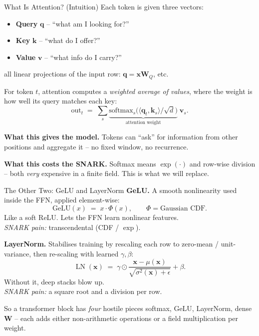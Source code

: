 \documentclass[10pt]{beamer}
\newcommand{\bx}{\mathbf{x}}
\newcommand{\bW}{\mathbf{W}}
\newcommand{\bk}{\mathbf{k}}
\newcommand{\bv}{\mathbf{v}}
\newcommand{\bq}{\mathbf{q}}
\newcommand{\softmax}{\mathrm{softmax}}
\DeclareMathOperator{\LN}{LN}
\begin{document}
\begin{frame}{What Is Attention? (Intuition)}
Each token is given three vectors:
\begin{itemize}
  \item \textbf{Query} $\bq$ -- ``what am I looking for?''
  \item \textbf{Key} $\bk$ -- ``what do I offer?''
  \item \textbf{Value} $\bv$ -- ``what info do I carry?''
\end{itemize}
all linear projections of the input row: $\bq=\bx\bW_Q$, etc.

\medskip
For token $t$, attention computes a \emph{weighted average of values},
where the weight is how well its query matches each key:
\[
  \mathrm{out}_t \;=\; \sum_{s} \underbrace{\softmax_s\!\bigl(\langle\bq_t,\bk_s\rangle/\sqrt d\bigr)}_{\text{attention weight}}\;\bv_s.
\]

\medskip
\textbf{What this gives the model.} Tokens can ``ask'' for
information from other positions and aggregate it -- no fixed
window, no recurrence.

\medskip
\textbf{What this costs the SNARK.} Softmax means
$\exp(\cdot)$ and row-wise division -- both \emph{very} expensive
in a finite field. This is what we will replace.
\end{frame}

\begin{frame}{The Other Two: GeLU and LayerNorm}
\textbf{GeLU.} A smooth nonlinearity used inside the FFN, applied
element-wise:
\[
  \mathrm{GeLU}(x) \;=\; x\cdot\Phi(x),\qquad \Phi=\text{Gaussian CDF}.
\]
Like a soft ReLU. Lets the FFN learn nonlinear features.\\
\emph{SNARK pain:} transcendental (CDF / $\exp$).

\medskip
\textbf{LayerNorm.} Stabilises training by rescaling each row to
zero-mean / unit-variance, then re-scaling with learned
$\gamma,\beta$:
\[
  \LN(\bx) \;=\; \gamma\odot\frac{\bx-\mu(\bx)}{\sqrt{\sigma^2(\bx)+\epsilon}}+\beta.
\]
Without it, deep stacks blow up.\\
\emph{SNARK pain:} a square root and a division per row.

\medskip
\begin{block}{So a transformer block has \emph{four} hostile pieces}
softmax, GeLU, LayerNorm, dense $\bW$ -- each adds either
non-arithmetic operations or a field multiplication per weight.
\end{block}
\end{frame}
\end{document}
